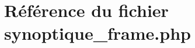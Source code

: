 \hypertarget{synoptique__frame_8php}{
\section{R\'{e}f\'{e}rence du fichier synoptique\_\-frame.php}
\label{synoptique__frame_8php}
}
